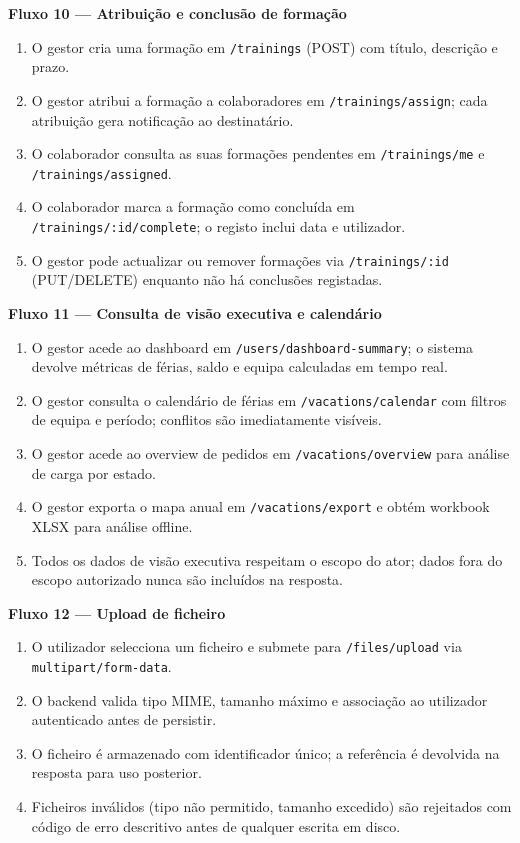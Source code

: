 \documentclass[11pt,a4paper,twoside]{article}
\begin{document}
\textbf{Fluxo 10 — Atribuição e conclusão de formação}
\begin{enumerate}
  \item O gestor cria uma formação em \texttt{/trainings} (POST) com título, descrição e prazo.
  \item O gestor atribui a formação a colaboradores em \texttt{/trainings/assign}; cada atribuição gera notificação ao destinatário.
  \item O colaborador consulta as suas formações pendentes em \texttt{/trainings/me} e \texttt{/trainings/assigned}.
  \item O colaborador marca a formação como concluída em \texttt{/trainings/:id/complete}; o registo inclui data e utilizador.
  \item O gestor pode actualizar ou remover formações via \texttt{/trainings/:id} (PUT/DELETE) enquanto não há conclusões registadas.
\end{enumerate}

\textbf{Fluxo 11 — Consulta de visão executiva e calendário}
\begin{enumerate}
  \item O gestor acede ao dashboard em \texttt{/users/dashboard-summary}; o sistema devolve métricas de férias, saldo e equipa calculadas em tempo real.
  \item O gestor consulta o calendário de férias em \texttt{/vacations/calendar} com filtros de equipa e período; conflitos são imediatamente visíveis.
  \item O gestor acede ao overview de pedidos em \texttt{/vacations/overview} para análise de carga por estado.
  \item O gestor exporta o mapa anual em \texttt{/vacations/export} e obtém workbook XLSX para análise offline.
  \item Todos os dados de visão executiva respeitam o escopo do ator; dados fora do escopo autorizado nunca são incluídos na resposta.
\end{enumerate}

\textbf{Fluxo 12 — Upload de ficheiro}
\begin{enumerate}
  \item O utilizador selecciona um ficheiro e submete para \texttt{/files/upload} via \texttt{multipart/form-data}.
  \item O backend valida tipo MIME, tamanho máximo e associação ao utilizador autenticado antes de persistir.
  \item O ficheiro é armazenado com identificador único; a referência é devolvida na resposta para uso posterior.
  \item Ficheiros inválidos (tipo não permitido, tamanho excedido) são rejeitados com código de erro descritivo antes de qualquer escrita em disco.
\end{enumerate}
\end{document}
